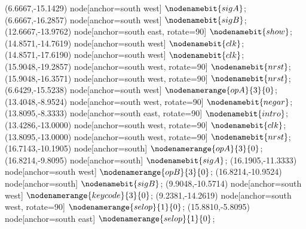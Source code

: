   (6.6667,-15.1429) node[anchor=south west] {$\nodenamebit{sigA}$};
   (6.6667,-16.2857) node[anchor=south west] {$\nodenamebit{sigB}$};
   (12.6667,-13.9762) node[anchor=south east, rotate=90] {$\nodenamebit{show}$};
   (14.8571,-14.7619) node[anchor=south west] {$\nodenamebit{clk}$};
   (14.8571,-17.6190) node[anchor=south west] {$\nodenamebit{clk}$};
   (15.9048,-19.2857) node[anchor=south west, rotate=90] {$\nodenamebit{nrst}$};
   (15.9048,-16.3571) node[anchor=south west, rotate=90] {$\nodenamebit{nrst}$};
   (6.6429,-15.5238) node[anchor=south west] {$\nodenamerange{opA}{3}{0}$};
   (13.4048,-8.9524) node[anchor=south west, rotate=90] {$\nodenamebit{negar}$};
   (13.8095,-8.3333) node[anchor=south east, rotate=90] {$\nodenamebit{intro}$};
   (13.4286,-13.0000) node[anchor=south west, rotate=90] {$\nodenamebit{clk}$};
   (13.8095,-13.0000) node[anchor=south west, rotate=90] {$\nodenamebit{nrst}$};
   (16.7143,-10.1905) node[anchor=south] {$\nodenamerange{opA}{3}{0}$};
   (16.8214,-9.8095) node[anchor=south] {$\nodenamebit{sigA}$};
   (16.1905,-11.3333) node[anchor=south west] {$\nodenamerange{opB}{3}{0}$};
   (16.8214,-10.9524) node[anchor=south] {$\nodenamebit{sigB}$};
   (9.9048,-10.5714) node[anchor=south west] {$\nodenamerange{keycode}{3}{0}$};
   (9.2381,-14.2619) node[anchor=south west, rotate=90] {$\nodenamerange{selop}{1}{0}$};
   (15.8810,-5.8095) node[anchor=south east] {$\nodenamerange{selop}{1}{0}$};
